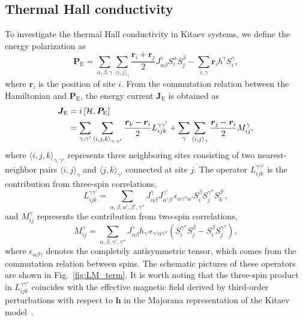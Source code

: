 \documentclass[twocolumn,superscriptaddress,showpacs, longbibliography, aps, prx]{revtex4-2}
\begin{document}
\subsection{Thermal Hall conductivity}\label{subsec:Thermal Hall conductivity}
To investigate the thermal Hall conductivity in Kitaev systems, we define the energy polarization as~\cite{Katsura2010,NasuYM2017}
\begin{equation}
  \bm{P}_{\mathrm{E}} = \sum_{\alpha,\beta,\gamma}\sum_{\langle i,j\rangle_\gamma} \frac{\bm{r}_i + \bm{r}_j}{2} J_{\alpha\beta}^\gamma S_i^\alpha S_j^\beta - \sum_{i,\gamma} \bm{r}_i h^\gamma S_i^\gamma,
\end{equation}
where $\bm{r}_i$ is the position of site $i$. 
From the commutation relation between the Hamiltonian and $\bm{P}_{\mathrm{E}}$, the energy current $\bm{J}_{\mathrm{E}}$ is obtained as 
\begin{align}
  \bm{J}_{\mathrm{E}} &=  i \left[\mathcal{H}, \bm{P}_{\mathrm{E}}\right] \notag \\
&= \sum_{\gamma,\gamma'}\sum_{\langle i,j,k\rangle_{\gamma,\gamma'}} \frac{\bm{r}_k-\bm{r}_i}{2}L_{ijk}^{\gamma\gamma'} + \sum_{\gamma}\sum_{\langle i,j\rangle_{\gamma}} \frac{\bm{r}_j-\bm{r}_i}{2}M_{ij}^{\gamma} 
\label{eq:def_J},
\end{align}
where $\langle i,j,k\rangle_{\gamma,\gamma'}$ represents three neighboring sites consisting of two nearest-neighbor pairs $\langle i,j\rangle_{\gamma}$ and $\langle j,k\rangle_{\gamma'}$ connected at site $j$.
The operator $L_{ijk}^{\gamma\gamma'}$ is the contribution from three-spin correlations,
\begin{equation}
  L_{ijk}^{\gamma\gamma'} = \sum_{\alpha,\beta,\alpha',\beta',\gamma''} J_{\alpha\beta}^\gamma J_{\alpha'\beta'}^{\gamma'} \epsilon_{\alpha\gamma''\alpha'} S_i^\beta S_j^{\gamma''}S_k^{\beta'},
\label{eq:L}
\end{equation}
and $M_{ij}^\gamma$ represents the contribution from two-spin correlations,
\begin{equation}
  M_{ij}^{\gamma} = \sum_{\alpha,\beta,\gamma',\gamma''} J_{\alpha\beta}^\gamma h_{\gamma'} \epsilon_{\gamma'\alpha\gamma''} \left(S_i^{\gamma''} S_j^{\beta} - S_i^{\beta} S_j^{\gamma''} \right),
\label{eq:M}
\end{equation}
where $\epsilon_{\alpha\beta\gamma}$ denotes the completely antisymmetric tensor, which comes from the commutation relation between spins. 
The schematic pictures of these operators are shown in Fig.~\ref{fig:LM_term}. 
It is worth noting that the three-spin product in $L_{ijk}^{\gamma\gamma'}$ coincides with the effective magnetic field derived by third-order perturbations with respect to $\bm{h}$ in the Majorana representation of the Kitaev model~\cite{Kitaev2006,NasuYM2017}.
\end{document}
